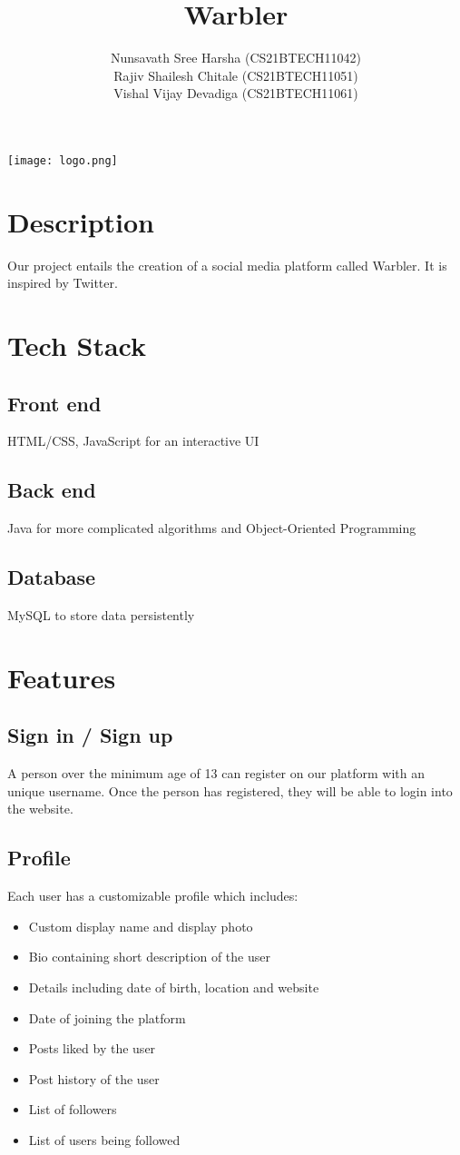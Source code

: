 \documentclass[journal,12pt,onecolumn]{IEEEtran}
\title{\color{teal} Warbler}
\author{Nunsavath Sree Harsha (CS21BTECH11042) \\ Rajiv Shailesh Chitale (CS21BTECH11051) \\ Vishal Vijay Devadiga (CS21BTECH11061)}
\begin{document}
\maketitle
\begin{center}
\texttt{[image: logo.png]}\\[1ex] 
\end{center}

\section*{\textbf{Description}}
Our project entails the creation of a social media platform called {\color{blue}Warbler}. It is inspired by Twitter.

\section*{\textbf{Tech Stack}}
\subsection*{\textbf{Front end}} HTML/CSS, JavaScript for an interactive UI
\subsection*{\textbf{Back end}} Java for more complicated algorithms and Object-Oriented Programming
\subsection*{\textbf{Database}} MySQL to store data persistently

\section*{\textbf{Features}} 
\subsection*{\textbf{Sign in / Sign up}}
\noindent A person over the minimum age of 13 can register on our platform with an unique username.
Once the person has registered, they will be able to login into the website.
%
\subsection*{\textbf{Profile}}
\noindent Each user has a customizable profile which includes:
\begin{itemize}
    \item Custom display name and display photo
    \item Bio containing short description of the user
    \item Details including date of birth, location and website
    \item Date of joining the platform
    \item Posts liked by the user
    \item Post history of the user
    \item List of followers
    \item List of users being followed
\end{itemize}
%
\end{document}
